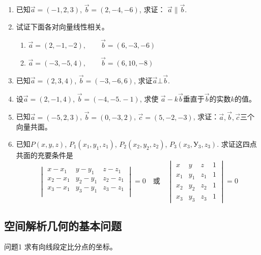 \begin{ex}
\begin{enumerate}
    \item 已知$\vec{a}=(-1,2,3)$, $\vec{b}=(2,-4,-6)$, 求证：
$\vec{a}\parallel \vec{b}$.
\item 试证下面各对向量线性相关。
\begin{enumerate}
    \item $\vec{a}=(2,-1,-2),\qquad \vec{b}=(6,-3,-6)$
    \item $\vec{a}=(-3,-5,4),\qquad   \vec{b}=(6,10,-8)$
\end{enumerate}

 \item 已知$\vec{a}=(2,3,4)$, $\vec{b}=(-3,-6,6)$, 求证$\vec{a}\bot \vec{b}$.

 \item 设$\vec{a}=(2,-1,4)$, $\vec{b}=(-4,-5.-1)$, 求使
 $\vec{a}-k\vec{b}$垂直于$\vec{b}$的实数$k$的值。

 \item 已知$\vec{a}=(-5,2,3)$, $\vec{b}=(0,-3,2)$, $\vec{c}=(5,
 -2,-3)$, 求证：$\vec{a},\vec{b},\vec{c}$三个向量共面。
\item 已知$P(x,y,z)$, $P_1(x_1,y_1,z_1)$, $P_2(x_2,y_2,
z_2)$, $P_3(x_3, У_3,z_3)$. 求证这四点共面的充要条件是
\[\begin{vmatrix}
    x-x_1 &y-y_1&z-z_1\\
    x_2-x_1 &y_2-y_1&z_2-z_1\\
    x_3-x_1 &y_3-y_1&z_3-z_1\\
\end{vmatrix}=0\quad \text{或}\quad \begin{vmatrix}
    x&y&z&1\\x_1 & y_1&z_1& 1\\
    x_2 & y_2&z_2& 1\\x_3 & y_3&z_3& 1
\end{vmatrix}=0\]
\end{enumerate}   
\end{ex}

\subsection{空间解析几何的基本问题}
\begin{blk}{问题1}
    求有向线段定比分点的坐标。
\end{blk}
 
